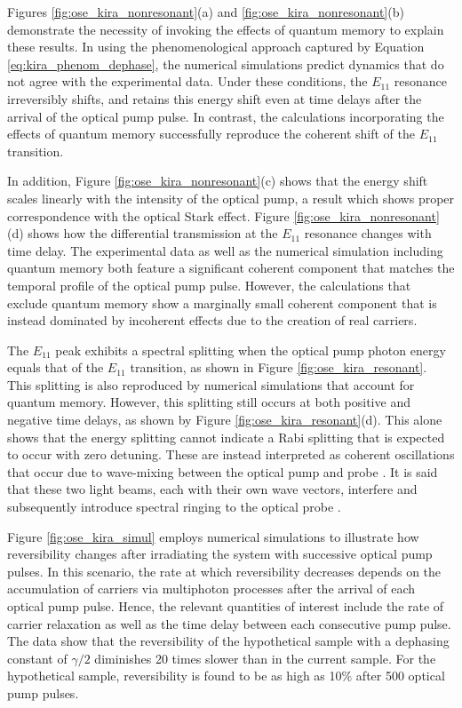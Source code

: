 Figures \ref{fig:ose_kira_nonresonant}(a) and \ref{fig:ose_kira_nonresonant}(b) demonstrate the necessity of invoking the effects of quantum memory to explain these results. In using the phenomenological approach captured by Equation \eqref{eq:kira_phenom_dephase}, the numerical simulations predict dynamics that do not agree with the experimental data. Under these conditions, the $E_{11}$ resonance irreversibly shifts, and retains this energy shift even at time delays after the arrival of the optical pump pulse. In contrast, the calculations incorporating the effects of quantum memory successfully reproduce the coherent shift of the $E_{11}$ transition.

In addition, Figure \ref{fig:ose_kira_nonresonant}(c) shows that the energy shift scales linearly with the intensity of the optical pump, a result which shows proper correspondence with the optical Stark effect. Figure \ref{fig:ose_kira_nonresonant}(d) shows how the differential transmission at the $E_{11}$ resonance changes with time delay. The experimental data as well as the numerical simulation including quantum memory both feature a significant coherent component that matches the temporal profile of the optical pump pulse. However, the calculations that exclude quantum memory show a marginally small coherent component that is instead dominated by incoherent effects due to the creation of real carriers.

The $E_{11}$ peak exhibits a spectral splitting when the optical pump photon energy equals that of the $E_{11}$ transition, as shown in Figure \ref{fig:ose_kira_resonant}. This splitting is also reproduced by numerical simulations that account for quantum memory. However, this splitting still occurs at both positive and negative time delays, as shown by Figure \ref{fig:ose_kira_resonant}(d). This alone shows that the energy splitting cannot indicate a Rabi splitting that is expected to occur with zero detuning. These are instead interpreted as coherent oscillations that occur due to wave-mixing between the optical pump and probe \cite{joffre1988coherent}. It is said that these two light beams, each with their own wave vectors, interfere and subsequently introduce spectral ringing to the optical probe \cite{joffre1988coherent}.

Figure \ref{fig:ose_kira_simul} employs numerical simulations to illustrate how reversibility changes after irradiating the system with successive optical pump pulses. In this scenario, the rate at which reversibility decreases depends on the accumulation of carriers via multiphoton processes after the arrival of each optical pump pulse. Hence, the relevant quantities of interest include the rate of carrier relaxation as well as the time delay between each consecutive pump pulse. The data show that the reversibility of the hypothetical sample with a dephasing constant of $\gamma/2$ diminishes 20 times slower than in the current sample. For the hypothetical sample, reversibility is found to be as high as 10\% after 500 optical pump pulses.

